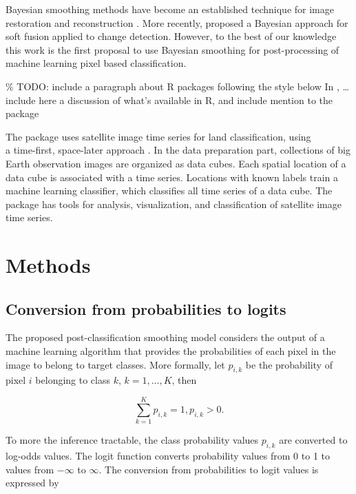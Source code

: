 \documentclass[
  shortnames]{jss}
\begin{document}
Bayesian smoothing methods have become an established technique for image restoration and reconstruction \citep{Hanson1993}. More recently, \citet{Wu2017} proposed a Bayesian
approach for soft fusion applied to change detection. However, to the best of our knowledge
this work is the first proposal to use Bayesian smoothing for post-processing of machine
learning pixel based classification.

\% TODO: include a paragraph about R packages following the style below
In , \ldots include here a discussion of what's available in R, and
include mention to the  package

The  package uses satellite image time series for land classification, using\\
a time-first, space-later approach \cite{Simoes2021}. In the data preparation part,
collections of big Earth observation images are organized as data cubes.
Each spatial location of a data cube
is associated with a time series. Locations with known labels train a machine learning
classifier, which classifies all time series of a data cube. The package has tools for
analysis, visualization, and classification of satellite image time series.

\hypertarget{methods}{%
\section{Methods}\label{methods}}

\hypertarget{conversion-from-probabilities-to-logits}{%
\subsection{Conversion from probabilities to logits}\label{conversion-from-probabilities-to-logits}}

The proposed post-classification smoothing model considers the output of a machine
learning algorithm that provides the probabilities of each pixel in the image to belong
to target classes. More formally, let \(p_{i,k}\) be the probability of pixel
\(i\) belonging to class \(k\), \(k=1,\dots{},K\), then

\begin{equation}
\sum_{k=1}^K p_{i,k} = 1, p_{i,k} > 0.
\end{equation}

To more the inference tractable, the class probability values \(p_{i,k}\) are converted to
log-odds values. The logit function converts probability values from
0 to 1 to values from \(-\infty\) to \(\infty\). The conversion from probabilities to logit
values is expressed by
\end{document}
